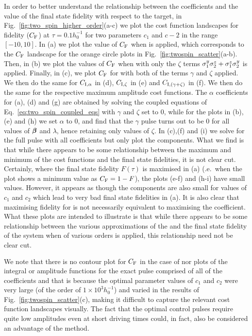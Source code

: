 In order to better understand the relationship between the  coefficients and the value of the final state fidelity with respect to the target, in Fig.~\ref{fig:two_spin_higher_order}(a-c) we plot the cost function landscapes for fidelity ($C_{\rm F}$) at $\tau = 0.1h_0^{-1}$ for two parameters $c_1$ and $c-2$ in the range $[-10, 10]$. In (a) we plot the value of $C_{\rm F}$ when   is applied, which corresponds to the $C_{\rm F}$ landscape for the orange circle plots in Fig.~\ref{fig:twospin_scatter}(a-b). Then, in (b) we plot the values of $C_{\rm F}$ when  with only the $\zeta$ terms $\sigma^y_1\sigma^z_2 + \sigma^z_1\sigma^y_2$ is applied. Finally, in (c), we plot $C_{\rm F}$ for   with both of the  terms $\gamma$ and $\zeta$ applied.  We then do the same for $C_{\rm I, \alpha}$ in (d), $C_{\rm I,\zeta}$ in (e) and $C_{\rm I,(\gamma + \zeta)}$ in (f). We then do the same for the respective maximum amplitude cost functions. The $\alpha$ coefficients for (a), (d) and (g) are obtained by solving the coupled equations of Eq.~\eqref{eq:two_spin_coupled_eqs} with $\gamma$ and $\zeta$ set to $0$, while for the plots in (b),(e) and (h) we set $\alpha$ to $0$, and find that the $\gamma$ pulse turns out to be $0$ for all values of $\boldsymbol{\beta}$ and $\lambda$, hence retaining only values of $\zeta$. In (c),(f) and (i) we solve for the full  pulse with all coefficients but only plot the  components. What we find is that while there appears to be some relationship between the maximum and minimum of the  cost functions and the final state fidelities, it is not clear cut. Certainly, where the final state fidelity $F(\tau)$ is maximised in (a) (\@i.e.~when the plot shows a minimum value as $C_{\rm F} = 1 - F$), the   plots (e-f) and (h-i) have small values. However, it appears as though the  components are also small for values of $c_1$ and $c_2$ which lead to very bad final state fidelities in (a). It is also clear that maximising fidelity for   is not necessarily equivalent to maximising the   coefficient. What these plots are intended to illustrate is that while there appears to be some relationship between the various approximations of the  and the final state fidelity of the system when  of various orders is applied, this relationship need not be clear cut.

We note that there is no contour plot for $C_{\rm F}$ in the case of  nor plots of the integral or amplitude functions for the exact  pulse comprised of all of the  coefficients and that is because the optimal parameter values of $c_1$ and $c_2$ were very large (of the order of $1\times10^3 h_0^{-1}$) and varied in the results of Fig.~\ref{fig:twospin_scatter}(c), making it difficult to capture the relevant cost function landscapes visually. The fact that the  optimal control pulses require quite low amplitudes even at short driving times could, in fact, also be considered an advantage of the method.

